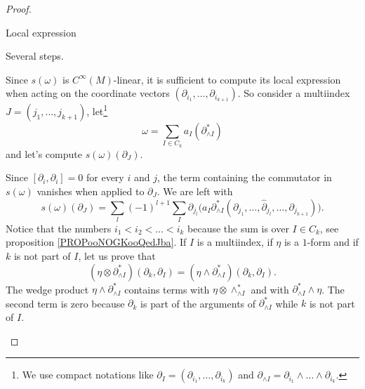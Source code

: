 \begin{proof}
	\begin{proofpart}
		Local expression
	\end{proofpart}

	Several steps.

	\begin{subproof}
		\spitem[Setting]


		Since \( s(\omega)\) is \( C^{\infty}(M)\)-linear, it is sufficient to compute its local expression when acting on the coordinate vectors \(  (\partial_{i_1},\ldots,\partial_{i_{k+1}})   \). So consider a multiindex \( J=(j_1,\ldots,j_{k+1})\), let\footnote{We use compact notations like \( \partial_I=(\partial_{i_1},\ldots,\partial_{i_k})\) and \( \partial_{\wedge I}=\partial_{i_1}\wedge \ldots\wedge \partial_{i_k}\).}
		\begin{equation}
			\omega=\sum_{I\in C_k}a_I(\partial_{\wedge I}^*)
		\end{equation}
		and let's compute \( s(\omega)(\partial_J)\).

		\spitem[Commutators]


		Since \( [\partial_i,\partial_i]=0\) for every \( i\) and \( j\), the term containing the commutator in \( s(\omega)\) vanishes when applied to \( \partial_J\). We are left with
		\begin{equation}
			s(\omega)(\partial_J)=\sum_l(-1)^{l+1}\sum_I\partial_{j_l}\big( a_I\partial^*_{\wedge I}(\partial_{j_1},\ldots,\hat\partial_{j_l},\ldots,\partial_{j_{k+1}}) \big).
		\end{equation}
		Notice that the numbers \( i_1<i_{2}<\ldots<i_k\) because the sum is over \( I\in C_k\), see proposition \ref{PROPooNOGKooQedJba}.
		If \( I\) is a multiindex, if \( \eta\) is a \( 1\)-form and if \( k\) is not part of \( I\), let us prove that
		\begin{equation}	\label{EQooLMTCooYAEiOy}
			(\eta\otimes \partial^*_{\wedge I})(\partial_k,\partial_I)=(\eta\wedge\partial^*_{\wedge I})(\partial_k,\partial_I).
		\end{equation}
		The wedge product \( \eta\wedge\partial^*_{\wedge I}\) contains terms with \( \eta\otimes\wedge^*_{\wedge I}\)  and with \( \partial^*_{\wedge I}\wedge \eta\). The second term is zero because \( \partial_k\) is part of the arguments of \( \partial^*_{\wedge I}\) while \( k\) is not part of \( I\).



\end{subproof}
\end{proof}
